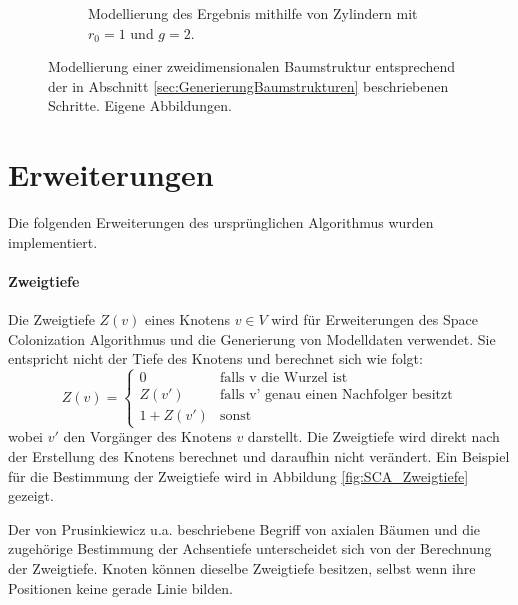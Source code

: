 \begin{figure} [hbtp]
\begin{subfigure}[t]{.4\textwidth}
		\caption{Modellierung des Ergebnis mithilfe von Zylindern mit $r_0 = 1$ und $g=2$.}
		\label{subfig:SCA_Extended4}
	\end{subfigure}
	\caption{Modellierung einer zweidimensionalen Baumstruktur entsprechend der in Abschnitt \ref{sec:GenerierungBaumstrukturen} beschriebenen Schritte. Eigene Abbildungen.}
	\label{fig:SCA_Extended}
\end{figure}

\section{Erweiterungen} \label{sec:SCA_Erweiterungen}

Die folgenden Erweiterungen des ursprünglichen Algorithmus wurden implementiert.

\paragraph{Zweigtiefe}

Die Zweigtiefe $Z(v)$ eines Knotens $v \in V$ wird für Erweiterungen des Space Colonization Algorithmus und die Generierung von Modelldaten verwendet. Sie entspricht nicht der Tiefe des Knotens und berechnet sich wie folgt:
\begin{equation}
Z(v)= \begin{cases}
0 & \text{falls v die Wurzel ist} \\
Z(v') & \text{falls v' genau einen Nachfolger besitzt}\\
1 + Z(v') & \text{sonst}
\end{cases} 
\end{equation}
wobei $v'$ den Vorgänger des Knotens $v$ darstellt. Die Zweigtiefe wird direkt nach der Erstellung des Knotens berechnet und daraufhin nicht verändert. Ein Beispiel für die Bestimmung der Zweigtiefe wird in Abbildung \ref{fig:SCA_Zweigtiefe} gezeigt.

Der von Prusinkiewicz u.a. \cite{ABOP:04} beschriebene Begriff von axialen Bäumen \cite[S.21]{ABOP:04} und die zugehörige Bestimmung der Achsentiefe unterscheidet sich von der Berechnung der Zweigtiefe. Knoten können dieselbe Zweigtiefe besitzen, selbst wenn ihre Positionen keine gerade Linie bilden.

